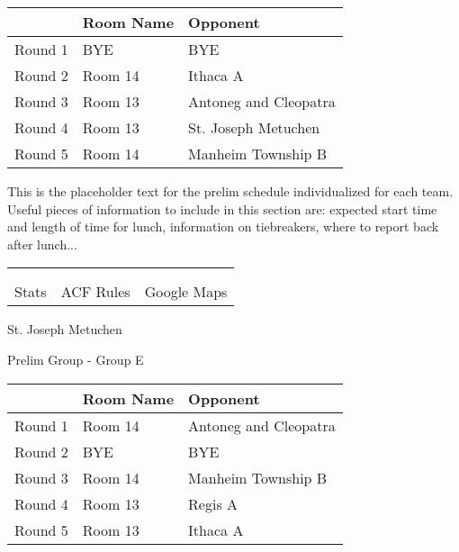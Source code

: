\documentclass{article}%
\begin{document}
\vspace*{4pt}%
\begin{tabularx}{\textwidth}{|c|Y|Y|}%
\hline%
&Room Name&Opponent\\%
\hline%
Round 1&BYE&BYE\\%
Round 2&Room 14&Ithaca A\\%
Round 3&Room 13&Antoneg and Cleopatra\\%
Round 4&Room 13&St. Joseph Metuchen\\%
Round 5&Room 14&Manheim Township B\\%
\hline%
\end{tabularx}%
\vspace*{30pt}%
\linebreak%
This is the placeholder text for the prelim schedule individualized for each team. Useful pieces of information to include in this section are: expected start time and length of time for lunch, information on tiebreakers, where to report back after lunch...%
\vspace*{30pt}%
\newline%
%
\begin{tabularx}{\textwidth}{YYY}%
  &  &  \\%
\\%
Stats&ACF Rules&Google Maps\\%
\end{tabularx}%
\newpage%
%
\begin{center}%
\begin{Huge}%
St. Joseph Metuchen%
\end{Huge}%
\vspace*{12pt}%
\linebreak%
\begin{Large}%
Prelim Group {-} Group E%
\end{Large}%
\end{center}%
\vspace*{4pt}%
\begin{tabularx}{\textwidth}{|c|Y|Y|}%
\hline%
&Room Name&Opponent\\%
\hline%
Round 1&Room 14&Antoneg and Cleopatra\\%
Round 2&BYE&BYE\\%
Round 3&Room 14&Manheim Township B\\%
Round 4&Room 13&Regis A\\%
Round 5&Room 13&Ithaca A\\%
\hline%
\end{tabularx}%
\end{document}
